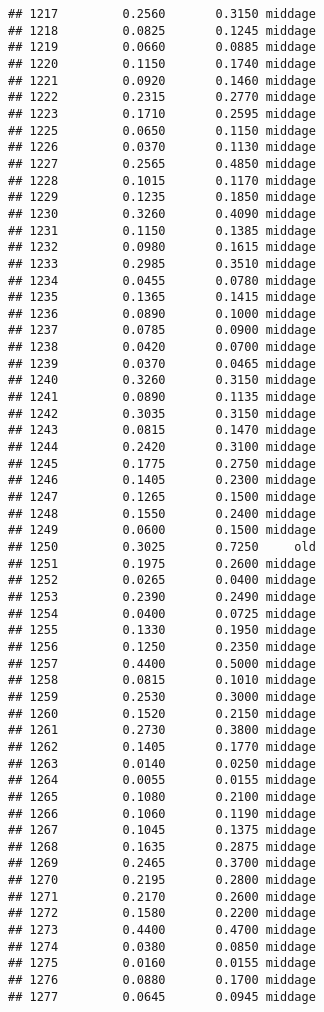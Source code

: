 \documentclass[
]{article}
\begin{document}
\begin{verbatim}
## 1217         0.2560       0.3150 middage
## 1218         0.0825       0.1245 middage
## 1219         0.0660       0.0885 middage
## 1220         0.1150       0.1740 middage
## 1221         0.0920       0.1460 middage
## 1222         0.2315       0.2770 middage
## 1223         0.1710       0.2595 middage
## 1225         0.0650       0.1150 middage
## 1226         0.0370       0.1130 middage
## 1227         0.2565       0.4850 middage
## 1228         0.1015       0.1170 middage
## 1229         0.1235       0.1850 middage
## 1230         0.3260       0.4090 middage
## 1231         0.1150       0.1385 middage
## 1232         0.0980       0.1615 middage
## 1233         0.2985       0.3510 middage
## 1234         0.0455       0.0780 middage
## 1235         0.1365       0.1415 middage
## 1236         0.0890       0.1000 middage
## 1237         0.0785       0.0900 middage
## 1238         0.0420       0.0700 middage
## 1239         0.0370       0.0465 middage
## 1240         0.3260       0.3150 middage
## 1241         0.0890       0.1135 middage
## 1242         0.3035       0.3150 middage
## 1243         0.0815       0.1470 middage
## 1244         0.2420       0.3100 middage
## 1245         0.1775       0.2750 middage
## 1246         0.1405       0.2300 middage
## 1247         0.1265       0.1500 middage
## 1248         0.1550       0.2400 middage
## 1249         0.0600       0.1500 middage
## 1250         0.3025       0.7250     old
## 1251         0.1975       0.2600 middage
## 1252         0.0265       0.0400 middage
## 1253         0.2390       0.2490 middage
## 1254         0.0400       0.0725 middage
## 1255         0.1330       0.1950 middage
## 1256         0.1250       0.2350 middage
## 1257         0.4400       0.5000 middage
## 1258         0.0815       0.1010 middage
## 1259         0.2530       0.3000 middage
## 1260         0.1520       0.2150 middage
## 1261         0.2730       0.3800 middage
## 1262         0.1405       0.1770 middage
## 1263         0.0140       0.0250 middage
## 1264         0.0055       0.0155 middage
## 1265         0.1080       0.2100 middage
## 1266         0.1060       0.1190 middage
## 1267         0.1045       0.1375 middage
## 1268         0.1635       0.2875 middage
## 1269         0.2465       0.3700 middage
## 1270         0.2195       0.2800 middage
## 1271         0.2170       0.2600 middage
## 1272         0.1580       0.2200 middage
## 1273         0.4400       0.4700 middage
## 1274         0.0380       0.0850 middage
## 1275         0.0160       0.0155 middage
## 1276         0.0880       0.1700 middage
## 1277         0.0645       0.0945 middage

\end{verbatim}
\end{document}
